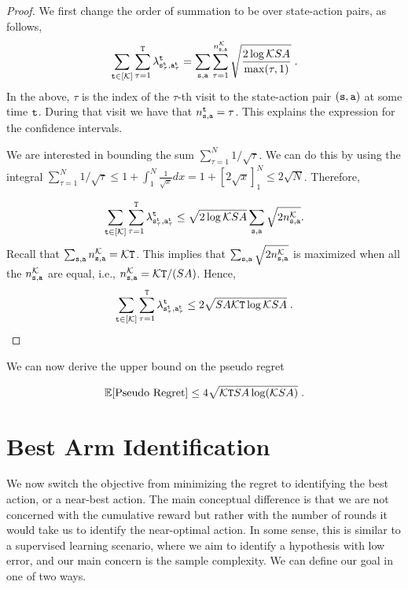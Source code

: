 \begin{proof}
    We first change the order of summation to be over state-action pairs, as follows,
    \[
    \sum_{{\tt t}\in [\mathcal K]} \sum_{\tau=1}^{\tt T}
\lambda^{\tt t}_{{\tt s}_\tau^{\tt t},{\tt a}_\tau^{\tt t}} =
\sum_{{\tt s},{\tt a}} \sum_{\tau=1}^{n_{{\tt s},{\tt a}}^\mathcal K}
\sqrt{\frac{2\log \mathcal K SA}{\max(\tau,1)}}\;.
    \]
In the above, $\tau$ is the index of the $\tau$-th visit to the state-action pair $({\tt s},{\tt a})$ at some time ${\tt t}$. During that visit we have that  $n_{{\tt s},{\tt a}}^{\tt t}=\tau$.
This explains the expression for the confidence intervals.

We are interested in bounding the sum $\sum_{\tau=1}^N 1/\sqrt{\tau}$. We can do this by using the integral $\sum_{\tau=1}^N 1/\sqrt{\tau}\leq 1+ \int_1^N \frac{1}{\sqrt{x}}dx= 1+[2\sqrt{x}]_1^N\leq 2\sqrt{N}$.
Therefore,

    \[
    \sum_{{\tt t}\in [\mathcal K]} \sum_{\tau=1}^{\tt T}
\lambda^{\tt t}_{{\tt s}_\tau^{\tt t},{\tt a}_\tau^{\tt t}} \leq
\sqrt{2\log \mathcal K SA}
\sum_{{\tt s},{\tt a}}
\sqrt{2 n_{{\tt s},{\tt a}}^\mathcal K }.
    \]
Recall that $\sum_{{\tt s},{\tt a}} n_{{\tt s},{\tt a}}^\mathcal K  =\mathcal K {\tt T}$. This implies that $\sum_{{\tt s},{\tt a}}
\sqrt{2 n_{{\tt s},{\tt a}}^\mathcal K }$ is maximized when all the $n_{{\tt s},{\tt a}}^\mathcal K $ are equal, i.e., $n_{{\tt s},{\tt a}}^\mathcal K =\mathcal K {\tt T}/(SA)$. Hence,
    \[
    \sum_{{\tt t}\in [\mathcal K]} \sum_{\tau=1}^{\tt T}
\lambda^{\tt t}_{{\tt s}_\tau^{\tt t},{\tt a}_\tau^{\tt t}} \leq
2
\sqrt{SA\mathcal K {\tt T}\log \mathcal K SA}\;.
    \]
\end{proof}

We can now derive the upper bound on the pseudo regret
\begin{theorem}
    \[
    \mathbb{E}[\text{Pseudo Regret}] \leq 4\sqrt{\mathcal K {\tt T} SA\log (\mathcal K SA)}\;.
    \]
\end{theorem}

\section{Best Arm Identification}

We now switch the objective from minimizing the regret to identifying the best action, or a near-best action. The main conceptual difference is that we are not concerned with the cumulative reward but rather with the number of rounds it would take us to identify the near-optimal action. 
In some sense, this is similar to a supervised learning scenario, where we aim to identify a hypothesis with low error, and our main concern is the sample complexity.
We can define our goal in one of two ways.

